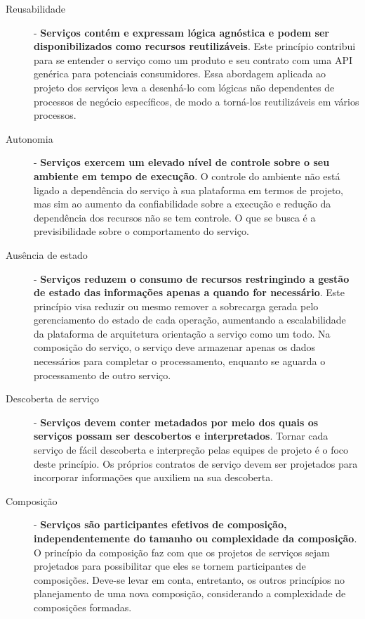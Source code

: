 \begin{description}
\item[Reusabilidade]- \textbf{Serviços contém e expressam lógica agnóstica e
podem ser disponibilizados como recursos reutilizáveis}. Este princípio
contribui para se entender o serviço como um produto e seu contrato com uma API
genérica para potenciais consumidores. Essa abordagem aplicada ao projeto dos
serviços leva a desenhá-lo com lógicas não dependentes de processos de negócio
específicos, de modo a torná-los reutilizáveis em vários processos.

\item[Autonomia]- \textbf{Serviços exercem um elevado nível de controle sobre
o seu ambiente em tempo de execução}. O controle do ambiente não está ligado a
dependência do serviço à sua plataforma em termos de projeto, mas sim ao aumento
da confiabilidade sobre a execução e redução da dependência dos recursos não se tem controle. 
O que se busca é a previsibilidade sobre o comportamento do serviço.

\item[Ausência de estado] - \textbf{Serviços reduzem o consumo de recursos
restringindo a gestão de estado das informações apenas a quando for necessário}.
Este princípio visa reduzir ou mesmo remover a sobrecarga gerada pelo
gerenciamento do estado de cada operação, aumentando a escalabilidade da
plataforma de arquitetura orientação a serviço como um todo. Na composição do
serviço, o serviço deve armazenar apenas os dados necessários para completar o
processamento, enquanto se aguarda o processamento de outro serviço.

\item[Descoberta de serviço] - \textbf{Serviços devem conter metadados por meio
dos quais os serviços possam ser descobertos e interpretados}. Tornar cada
serviço de fácil descoberta e interpreção pelas equipes de projeto é o foco
deste princípio. Os próprios contratos de serviço devem ser projetados para
incorporar informações que auxiliem na sua descoberta.

\item[Composição] - \textbf{Serviços são participantes efetivos de composição,
independentemente do tamanho ou complexidade da composição}. O princípio da
composição faz com que os projetos de serviços sejam projetados para
possibilitar que eles se tornem participantes de composições. Deve-se levar em
conta, entretanto, os outros princípios no planejamento de uma nova composição,
considerando a complexidade de composições formadas.

\end{description}
 

